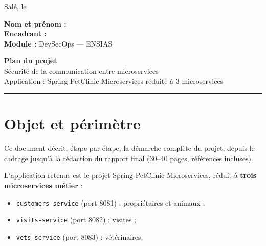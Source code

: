 \documentclass[12pt,a4paper]{article}
\newcommand{\code}[1]{\texttt{\small #1}}
\begin{document}
\begin{flushright}
Salé, le \underline{\hspace{3cm}}
\end{flushright}

\vspace{0.3cm}

\noindent
\textbf{Nom et prénom :} \underline{\hspace{6cm}}\\[0.5em]
\textbf{Encadrant :} \underline{\hspace{6cm}}\\[0.5em]
\textbf{Module :} DevSecOps --- ENSIAS

\vspace{0.8cm}

\begin{center}
{\Large\bfseries Plan du projet}\\[0.4em]
{\large S\'ecurit\'e de la communication entre microservices}\\[0.3em]
{\normalsize Application : Spring PetClinic Microservices r\'eduite \`a 3 microservices}
\end{center}

\vspace{0.6cm}

\hrule

\vspace{0.6cm}

\section*{Objet et p\'erim\`etre}

Ce document d\'ecrit, \'etape par \'etape, la d\'emarche compl\`ete du projet, depuis le cadrage
jusqu'\`a la r\'edaction du rapport final (30--40 pages, r\'ef\'erences incluses).

L'application retenue est le projet Spring PetClinic Microservices, r\'eduit \`a
\textbf{trois microservices m\'etier} :

\begin{itemize}[leftmargin=1.4em,itemsep=0.1em]
  \item \code{customers-service} (port 8081) : propri\'etaires et animaux ;
  \item \code{visits-service} (port 8082) : visites ;
  \item \code{vets-service} (port 8083) : v\'et\'erinaires.
\end{itemize}
\end{document}
